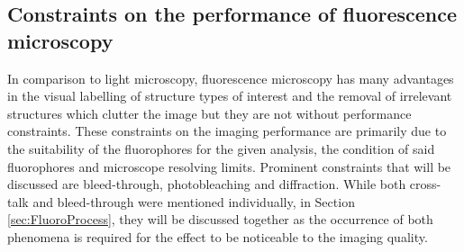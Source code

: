 \subsection{Constraints on the performance of fluorescence microscopy}\label{sec:ConstraintsMicrosc}
In comparison to light microscopy, fluorescence microscopy has many advantages in the visual labelling of structure types of interest and the removal of irrelevant structures which clutter the image but they are not without performance constraints. These constraints on the imaging performance are primarily due to the suitability of the fluorophores for the given analysis, the condition of said fluorophores and microscope resolving limits. Prominent constraints that will be discussed are bleed-through, photobleaching and diffraction. While both cross-talk and bleed-through were mentioned individually, in Section \ref{sec:FluoroProcess}, they will be discussed together as the occurrence of both phenomena is required for the effect to be noticeable to the imaging quality. 

